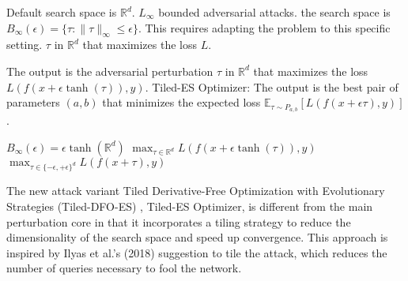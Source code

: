 Default search space is $\mathbb{R}^d$.
$L_{\infty}$ bounded adversarial attacks. 
the search space is $B_{\infty}(\epsilon) = \{\tau : \|\tau\|_{\infty} \leq \epsilon\}$. This requires adapting the problem to this specific setting.
$\tau$ in $\mathbb{R}^d$ that maximizes the loss $L$.

The output is the adversarial perturbation $\tau$ in $\mathbb{R}^d$ that maximizes the loss $L(f(x + \epsilon \tanh(\tau)), y)$.
Tiled-ES Optimizer: The output is the best pair of parameters $(a, b)$ that minimizes the expected loss $\mathbb{E}_{\tau \sim P_{a,b}} [L(f(x + \epsilon \tau), y)]$.

$B_{\infty}(\epsilon) = \epsilon \tanh(\mathbb{R}^d) $
$\max_{\tau \in \mathbb{R}^d} L(f(x + \epsilon \tanh(\tau)), y)$
$\max_{\tau \in \{-\epsilon, +\epsilon\}^d} L(f(x + \tau), y)$

The new attack variant Tiled Derivative-Free Optimization with Evolutionary Strategies (Tiled-DFO-ES) , Tiled-ES Optimizer, is different from the main perturbation core in that it incorporates a tiling strategy to reduce the dimensionality of the search space and speed up convergence. This approach is inspired by Ilyas et al.'s (2018) suggestion to tile the attack, which reduces the number of queries necessary to fool the network.